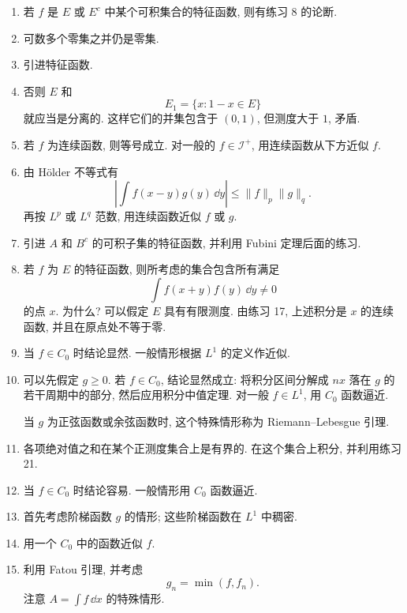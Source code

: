 \begin{enumerate}
	\item 若 \(f\) 是 \(E\) 或 \(E^c\) 中某个可积集合的特征函数, 则有练习 8 的论断.
	
	\item 可数多个零集之并仍是零集.
	
	\item 引进特征函数.
	
	\item 否则 \(E\) 和
	\[
	E_1=\{x:1-x\in E\}
	\]
	就应当是分离的. 这样它们的并集包含于 \((0,1)\), 但测度大于 \(1\), 矛盾.
	
	\item 若 \(f\) 为连续函数, 则等号成立. 对一般的 \(f\in\mathcal I^+\), 用连续函数从下方近似 \(f\).
	
	\item 由 H\"older 不等式有
	\[
	\left|
	\int f(x-y)g(y)\,\dd y
	\right|
	\leq
	\|f\|_p\|g\|_q.
	\]
	再按 \(L^p\) 或 \(L^q\) 范数, 用连续函数近似 \(f\) 或 \(g\).
	
	\item 引进 \(A\) 和 \(B^c\) 的可积子集的特征函数, 并利用 Fubini 定理后面的练习.
	
	\item 若 \(f\) 为 \(E\) 的特征函数, 则所考虑的集合包含所有满足
	\[
	\int f(x+y)f(y)\,\dd y\neq0
	\]
	的点 \(x\). 为什么? 可以假定 \(E\) 具有有限测度. 由练习 17, 上述积分是 \(x\) 的连续函数, 并且在原点处不等于零.
	
	\item 当 \(f\in C_0\) 时结论显然. 一般情形根据 \(L^1\) 的定义作近似.
	
	\item 可以先假定 \(g\geq0\). 若 \(f\in C_0\), 结论显然成立: 将积分区间分解成 \(nx\) 落在 \(g\) 的若干周期中的部分, 然后应用积分中值定理. 对一般 \(f\in L^1\), 用 \(C_0\) 函数逼近.
	
	当 \(g\) 为正弦函数或余弦函数时, 这个特殊情形称为 Riemann--Lebesgue 引理.
	
	\item 各项绝对值之和在某个正测度集合上是有界的. 在这个集合上积分, 并利用练习 21.
	
	\item 当 \(f\in C_0\) 时结论容易. 一般情形用 \(C_0\) 函数逼近.
	
	\item 首先考虑阶梯函数 \(g\) 的情形; 这些阶梯函数在 \(L^1\) 中稠密.
	
	\item 用一个 \(C_0\) 中的函数近似 \(f\).
	
	\item 利用 Fatou 引理, 并考虑
	\[
	g_n=\min(f,f_n).
	\]
	注意 \(A=\int f\,\dd x\) 的特殊情形.
	

\end{enumerate}
